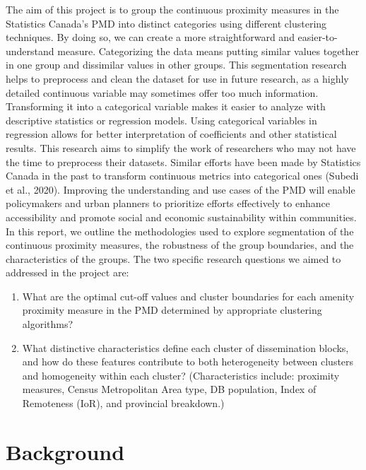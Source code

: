 \documentclass[11pt, a4paper]{article}
\begin{document}
The aim of this project is to group the continuous proximity measures in the Statistics Canada's PMD into distinct categories using different clustering techniques. By doing so, we can create a more straightforward and easier-to-understand measure. Categorizing the data means putting similar values together in one group and dissimilar values in other groups. This segmentation research helps to preprocess and clean the dataset for use in future research, as a highly detailed continuous variable may sometimes offer too much information. Transforming it into a categorical variable makes it easier to analyze with descriptive statistics or regression models. Using categorical variables in regression allows for better interpretation of coefficients and other statistical results. This research aims to simplify the work of researchers who may not have the time to preprocess their datasets. Similar efforts have been made by Statistics Canada in the past to transform continuous metrics into categorical ones (Subedi et al., 2020). Improving the understanding and use cases of the PMD will enable policymakers and urban planners to prioritize efforts effectively to enhance accessibility and promote social and economic sustainability within communities. In this report, we outline the methodologies used to explore segmentation of the continuous proximity measures, the robustness of the group boundaries, and the characteristics of the groups.
The two specific research questions we aimed to addressed in the project are:

\begin{enumerate}
\item What are the optimal cut-off values and cluster boundaries for each amenity proximity measure in the PMD determined by appropriate clustering algorithms?
\item What distinctive characteristics define each cluster of dissemination blocks, and how do these features contribute to both heterogeneity between clusters and homogeneity within each cluster? (Characteristics include: proximity measures, Census Metropolitan Area type, DB population, Index of Remoteness (IoR), and provincial breakdown.)
\end{enumerate}








\pagebreak
\section{Background}
\end{document}
